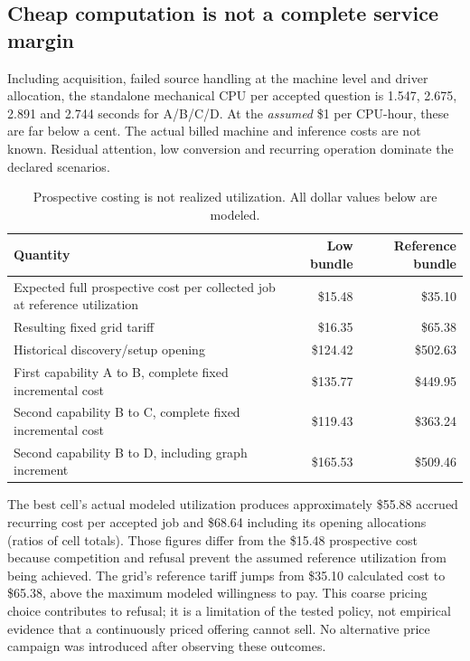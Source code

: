 \subsection{Cheap computation is not a complete service margin}

Including acquisition, failed source handling at the machine level and driver allocation, the
standalone mechanical CPU per accepted question is 1.547, 2.675, 2.891 and 2.744 seconds for
A/B/C/D. At the \emph{assumed} \$1 per CPU-hour, these are far below a cent. The actual billed
machine and inference costs are not known. Residual attention, low conversion and recurring
operation dominate the declared scenarios.

\begin{table}[htbp]\small
\caption{Prospective costing is not realized utilization. All dollar values below are modeled.}
\begin{tabularx}{\linewidth}{@{}Yrr@{}}
\toprule Quantity & Low bundle & Reference bundle\\ \midrule
Expected full prospective cost per collected job at reference utilization & \$15.48 & \$35.10\\
Resulting fixed grid tariff & \$16.35 & \$65.38\\
Historical discovery/setup opening & \$124.42 & \$502.63\\
First capability A to B, complete fixed incremental cost & \$135.77 & \$449.95\\
Second capability B to C, complete fixed incremental cost & \$119.43 & \$363.24\\
Second capability B to D, including graph increment & \$165.53 & \$509.46\\
\bottomrule\end{tabularx}
\end{table}

The best cell's actual modeled utilization produces approximately \$55.88 accrued recurring
cost per accepted job and \$68.64 including its opening allocations (ratios of cell totals).
Those figures differ from the \$15.48 prospective cost because competition and refusal prevent
the assumed reference utilization from being achieved. The grid's reference tariff jumps from
\$35.10 calculated cost to \$65.38, above the maximum modeled willingness to pay. This coarse
pricing choice contributes to refusal; it is a limitation of the tested policy, not empirical
evidence that a continuously priced offering cannot sell. No alternative price campaign was
introduced after observing these outcomes.

